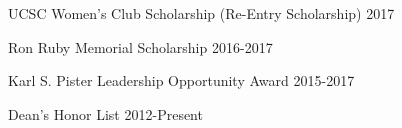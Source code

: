 \begin{cvhonors}
 \cvhonor
	{UCSC Women's Club Scholarship (Re-Entry Scholarship)}
	{2017}

 \cvhonor
	{Ron Ruby Memorial Scholarship}
	{2016-2017}
	
 \cvhonor
	{Karl S. Pister Leadership Opportunity Award}
	{2015-2017}

 \cvhonor
	{Dean's Honor List}
	{2012-Present}
	
	\vspace{0.05cm}
\end{cvhonors}
